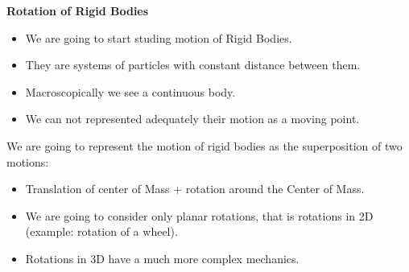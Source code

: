 \documentclass[]{beamer}
\begin{document}
\begin{frame}
    \textbf{Rotation of Rigid Bodies}
    \vspace{7mm}

     \begin{itemize}
         \item We are going to start studing motion of Rigid Bodies.
         \pause
         \item They are systems of particles with constant distance between them.
    \pause
         \item Macroscopically we see a continuous body.
         \pause 
         \item We can not represented adequately their motion as a moving point.
     \end{itemize}

     \end{frame}


    
\begin{frame}
  

     We are going to represent the motion of rigid bodies as the superposition of two motions:
     \pause
     \begin{itemize}
    
         \item Translation of center of Mass + rotation around the Center of Mass.
         \pause
         \item We are going to consider only planar rotations, that is rotations in 2D (example: rotation of a wheel).
         \pause
         \item Rotations in 3D have a much more complex mechanics.
   

        \end{itemize}



     \end{frame}

\end{document}
